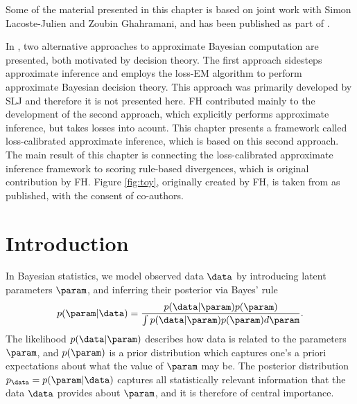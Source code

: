 \begin{summarycontributions}
\cbstart
Some of the material presented in this chapter is based on joint work with Simon Lacoste-Julien and Zoubin Ghahramani, and has been published as part of \citep{Lacoste2011}.

In \citep{Lacoste2011}, two alternative approaches to approximate Bayesian computation are presented, both motivated by decision theory. The first approach sidesteps approximate inference and employs the loss-EM algorithm to perform approximate Bayesian decision theory. This approach was primarily developed by SLJ and therefore it is not presented here. FH contributed mainly to the development of the second approach, which explicitly performs approximate inference, but takes losses into acount. This chapter presents a framework called loss-calibrated approximate inference, which is based on this second approach. The main result of this chapter is connecting the loss-calibrated approximate inference framework to scoring rule-based divergences, which is original contribution by FH. Figure \ref{fig:toy}, originally created by FH, is taken from \citep{Lacoste2011} as published, with the consent of co-authors.
\cbend	
\end{summarycontributions}


\section{Introduction}

In Bayesian statistics, we model observed data $\data$ by introducing latent parameters $\param$, and inferring their posterior via Bayes' rule
%
\begin{equation}
	p(\param\vert\data) = \frac{p(\data\vert\param) p(\param)}{\int p(\data\vert\param) p(\param) d\param}.
\end{equation}
%
The likelihood $p(\data\vert\param)$ describes how data is related to the parameters $\param$, and $p(\param)$ is a prior distribution which captures one's a priori expectations about what the value of $\param$ may be. The posterior distribution $p_\data = p(\param\vert\data)$ captures all statistically relevant information that the data $\data$ provides about $\param$, and it is therefore of central importance.

